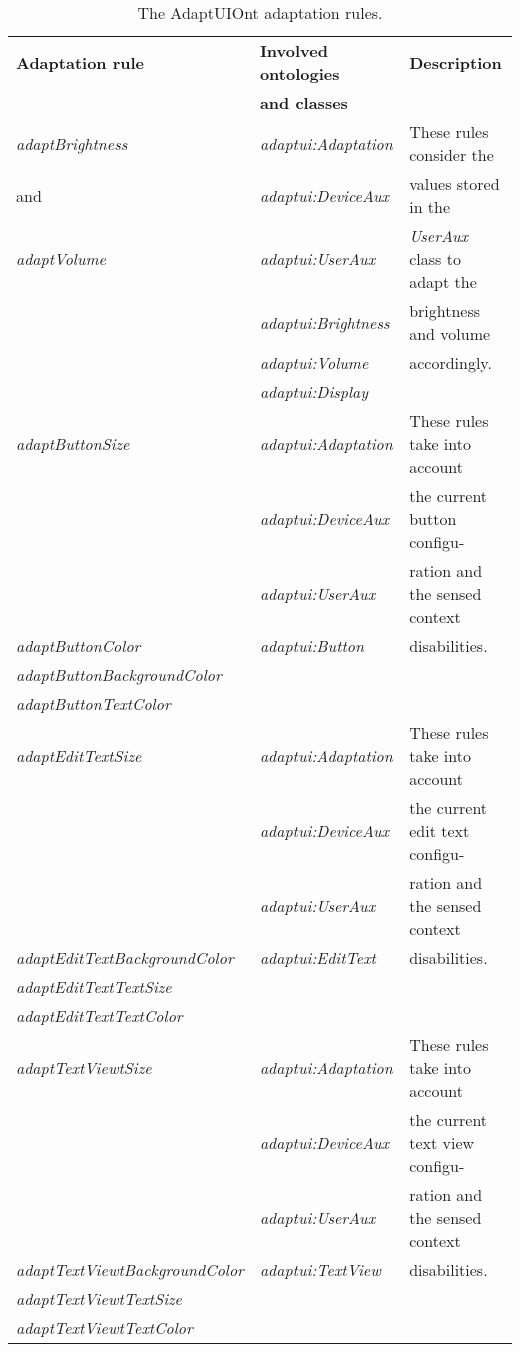 \begin{table}
  \caption{The AdaptUIOnt adaptation rules.}
 \label{tbl:adaptation_rules}
\footnotesize
\centering
 \begin{tabular}{l l l}
  \hline 
  \textbf{Adaptation rule} 	& \textbf{Involved ontologies} 	& \textbf{Description} 		\\
				& \textbf{and classes} 		& 				\\
  \hline
  \textit{adaptBrightness}	& \textit{adaptui:Adaptation}	& These rules consider the  	\\
  and				& \textit{adaptui:DeviceAux}	& values stored in the 		\\
  \textit{adaptVolume}		& \textit{adaptui:UserAux}	& \textit{UserAux} class to adapt the \\
				& \textit{adaptui:Brightness}	& brightness and volume 	\\
				& \textit{adaptui:Volume}	& accordingly. 			\\
				& \textit{adaptui:Display}	& 				\\
  \hline 
  \textit{adaptButtonSize}	& \textit{adaptui:Adaptation}	& These rules take into account	\\
				& \textit{adaptui:DeviceAux}	& the current button configu-	\\
				& \textit{adaptui:UserAux}	& ration and the sensed context	\\
  \textit{adaptButtonColor}	& \textit{adaptui:Button}	& disabilities.			\\
  \textit{adaptButtonBackgroundColor}&				& 				\\
  \textit{adaptButtonTextColor}	& 				& 				\\

  \hline
  \textit{adaptEditTextSize}	& \textit{adaptui:Adaptation}	& These rules take into account	\\
				& \textit{adaptui:DeviceAux}	& the current edit text configu-\\
				& \textit{adaptui:UserAux}	& ration and the sensed	context	\\
  \textit{adaptEditTextBackgroundColor}	& \textit{adaptui:EditText}& disabilities.		\\
  \textit{adaptEditTextTextSize}& 				& 				\\
  \textit{adaptEditTextTextColor}&				& 				\\

  \hline 
  \textit{adaptTextViewtSize}	& \textit{adaptui:Adaptation}	& These rules take into account	\\
				& \textit{adaptui:DeviceAux}	& the current text view configu-\\
				& \textit{adaptui:UserAux}	& ration and the sensed	context	\\
  \textit{adaptTextViewtBackgroundColor}& \textit{adaptui:TextView}& disabilities.		\\
  \textit{adaptTextViewtTextSize}&				& 				\\
  \textit{adaptTextViewtTextColor}&				& 				\\
  \hline 
\end{tabular}
\end{table}

